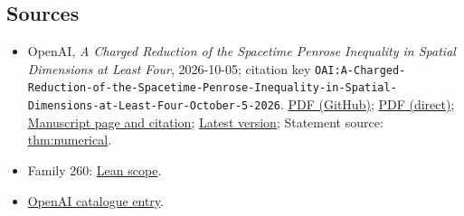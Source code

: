 \documentclass[11pt]{article}
\begin{document}
\subsection{Sources}
\begin{itemize}
\item OpenAI, \emph{A Charged Reduction of the Spacetime Penrose Inequality in Spatial Dimensions at Least Four}, 2026-10-05; citation key \texttt{OAI:A-Charged-Reduction-of-the-Spacetime-Penrose-Inequality-in-Spatial-Dimensions-at-Least-Four-October-5-2026}. \href{https://github.com/openai/math/blob/adc7f1241b42e322a6451854ab7e4b4c146bf78a/preprints/A-Charged-Reduction-of-the-Spacetime-Penrose-Inequality-in-Spatial-Dimensions-at-Least-Four-October-5-2026/paper.pdf}{PDF (GitHub)}; \href{https://github.com/openai/math/raw/adc7f1241b42e322a6451854ab7e4b4c146bf78a/preprints/A-Charged-Reduction-of-the-Spacetime-Penrose-Inequality-in-Spatial-Dimensions-at-Least-Four-October-5-2026/paper.pdf}{PDF (direct)}; \href{https://github.com/openai/math/blob/adc7f1241b42e322a6451854ab7e4b4c146bf78a/preprints/A-Charged-Reduction-of-the-Spacetime-Penrose-Inequality-in-Spatial-Dimensions-at-Least-Four-October-5-2026/README.md}{Manuscript page and citation}; \href{https://github.com/openai/math/blob/main/preprints/A-Charged-Reduction-of-the-Spacetime-Penrose-Inequality-in-Spatial-Dimensions-at-Least-Four-October-5-2026/paper.pdf}{Latest version}; Statement source: \href{https://github.com/openai/math/blob/adc7f1241b42e322a6451854ab7e4b4c146bf78a/preprints/A-Charged-Reduction-of-the-Spacetime-Penrose-Inequality-in-Spatial-Dimensions-at-Least-Four-October-5-2026/build/sections/01-statements.tex\#L145}{thm:numerical}.
\item Family 260: \href{https://github.com/openai/math/blob/adc7f1241b42e322a6451854ab7e4b4c146bf78a/lean/docs/260.md}{Lean scope}.
\item \href{https://github.com/openai/math/blob/adc7f1241b42e322a6451854ab7e4b4c146bf78a/CONTENTS.md}{OpenAI catalogue entry}.
\end{itemize}
\end{document}
